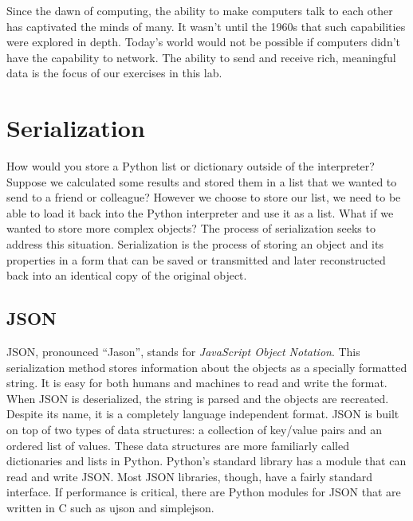 \label{lab:webtech}

Since the dawn of computing, the ability to make computers talk to each other has captivated the minds of many.
It wasn't until the 1960s that such capabilities were explored in depth.
Today's world would not be possible if computers didn't have the capability to network.
The ability to send and receive rich, meaningful data is the focus of our exercises in this lab.

\section*{Serialization}
How would you store a Python list or dictionary outside of the interpreter?
Suppose we calculated some results and stored them in a list that we wanted to send to a friend or colleague?
However we choose to store our list, we need to be able to load it back into the Python interpreter and use it as a list.
What if we wanted to store more complex objects?
The process of serialization seeks to address this situation.
Serialization is the process of storing an object and its properties in a form that can be saved or transmitted and later reconstructed back into an identical copy of the original object.

\subsection*{JSON}
JSON, pronounced ``Jason'', stands for \emph{JavaScript Object Notation}.
This serialization method stores information about the objects as a specially formatted string.
It is easy for both humans and machines to read and write the format.
When JSON is deserialized, the string is parsed and the objects are recreated.
Despite its name, it is a completely language independent format.
JSON is built on top of two types of data structures: a collection of key/value pairs and an ordered list of values.
These data structures are more familiarly called dictionaries and lists in Python.
Python's standard library has a module that can read and write JSON.
Most JSON libraries, though, have a fairly standard interface.
If performance is critical, there are Python modules for JSON that are written in C such as ujson and simplejson.

